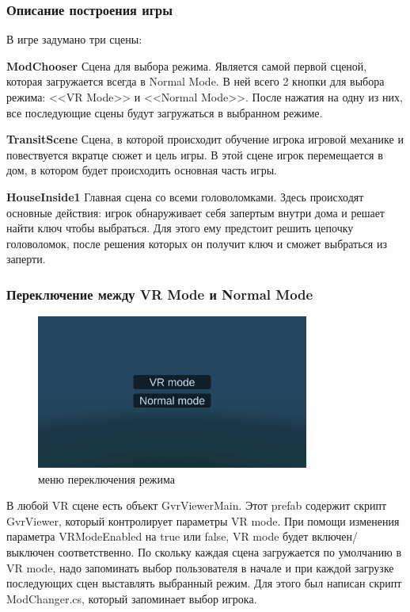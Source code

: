 \subsubsection{Описание построения игры}
В игре задумано три сцены:
\begin{my_enumerate}
    \item \textbf{ModChooser} Сцена для выбора режима. Является самой первой 
    сценой, которая загружается всегда в Normal Mode. В ней всего 2 кнопки для 
    выбора режима: <<VR Mode>> и <<Normal Mode>>. После нажатия на одну из них, 
    все последующие сцены будут загружаться в выбранном режиме.
    \item \textbf{TransitScene} Сцена, в которой происходит обучение игрока 
    игровой механике и повествуется вкратце сюжет и цель игры. В этой сцене 
    игрок перемещается в дом, в котором будет происходить основная часть игры.
    \item \textbf{HouseInside1} Главная сцена со всеми головоломками. Здесь 
    происходят основные действия: игрок обнаруживает себя запертым внутри дома 
    и решает найти ключ чтобы выбраться. Для этого ему предстоит решить цепочку 
    головоломок, после решения которых он получит ключ и сможет выбраться из 
    заперти.
\end{my_enumerate}


\subsubsection{Переключение между VR Mode и Normal Mode}

\begin{figure}[h!]
    \centering
    \includegraphics[width=0.8\textwidth]{./screenshots/modes.jpg}
    \caption{\small{меню переключения режима}}
    \label{modes}
\end{figure}

\tab[0.75cm]В любой VR сцене есть объект GvrViewerMain. Этот prefab содержит 
скрипт GvrViewer, который контролирует параметры VR mode. При помощи изменения 
параметра VRModeEnabled на true или false, VR mode будет включен/ выключен 
соответственно. По скольку каждая сцена загружается по умолчанию в VR mode, 
надо запоминать выбор пользователя в начале и при каждой загрузке последующих 
сцен выставлять выбранный режим. Для этого был написан скрипт ModChanger.cs, 
который запоминает выбор игрока.

